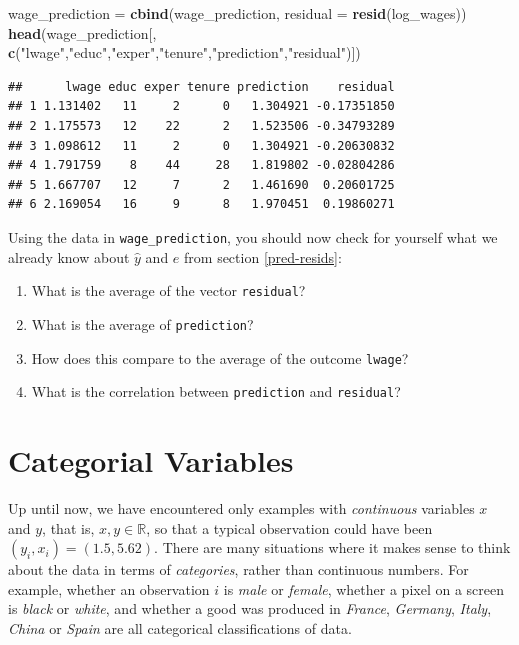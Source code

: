 \documentclass[]{book}
\newenvironment{Shaded}{\begin{snugshade}}{\end{snugshade}}
\newcommand{\KeywordTok}[1]{\textcolor[rgb]{0.13,0.29,0.53}{\textbf{#1}}}
\newcommand{\DataTypeTok}[1]{\textcolor[rgb]{0.13,0.29,0.53}{#1}}
\newcommand{\StringTok}[1]{\textcolor[rgb]{0.31,0.60,0.02}{#1}}
\newcommand{\NormalTok}[1]{#1}
\providecommand{\tightlist}{%
  \setlength{\itemsep}{0pt}\setlength{\parskip}{0pt}}
\begin{document}
\begin{Shaded}
\begin{Highlighting}[]
\NormalTok{wage_prediction =}\StringTok{ }\KeywordTok{cbind}\NormalTok{(wage_prediction, }\DataTypeTok{residual =} \KeywordTok{resid}\NormalTok{(log_wages))}
\KeywordTok{head}\NormalTok{(wage_prediction[, }\KeywordTok{c}\NormalTok{(}\StringTok{"lwage"}\NormalTok{,}\StringTok{"educ"}\NormalTok{,}\StringTok{"exper"}\NormalTok{,}\StringTok{"tenure"}\NormalTok{,}\StringTok{"prediction"}\NormalTok{,}\StringTok{"residual"}\NormalTok{)])}
\end{Highlighting}
\end{Shaded}

\begin{verbatim}
##      lwage educ exper tenure prediction    residual
## 1 1.131402   11     2      0   1.304921 -0.17351850
## 2 1.175573   12    22      2   1.523506 -0.34793289
## 3 1.098612   11     2      0   1.304921 -0.20630832
## 4 1.791759    8    44     28   1.819802 -0.02804286
## 5 1.667707   12     7      2   1.461690  0.20601725
## 6 2.169054   16     9      8   1.970451  0.19860271
\end{verbatim}

Using the data in \texttt{wage\_prediction}, you should now check for
yourself what we already know about \(\hat{y}\) and \(e\) from section
\ref{pred-resids}:

\begin{enumerate}
\def\labelenumi{\arabic{enumi}.}
\tightlist
\item
  What is the average of the vector \texttt{residual}?
\item
  What is the average of \texttt{prediction}?
\item
  How does this compare to the average of the outcome \texttt{lwage}?
\item
  What is the correlation between \texttt{prediction} and
  \texttt{residual}?
\end{enumerate}

\chapter{Categorial Variables}\label{categorical-vars}

Up until now, we have encountered only examples with \emph{continuous}
variables \(x\) and \(y\), that is, \(x,y \in \mathbb{R}\), so that a
typical observation could have been \((y_i,x_i) = (1.5,5.62)\). There
are many situations where it makes sense to think about the data in
terms of \emph{categories}, rather than continuous numbers. For example,
whether an observation \(i\) is \emph{male} or \emph{female}, whether a
pixel on a screen is \emph{black} or \emph{white}, and whether a good
was produced in \emph{France}, \emph{Germany}, \emph{Italy},
\emph{China} or \emph{Spain} are all categorical classifications of
data.
\end{document}
